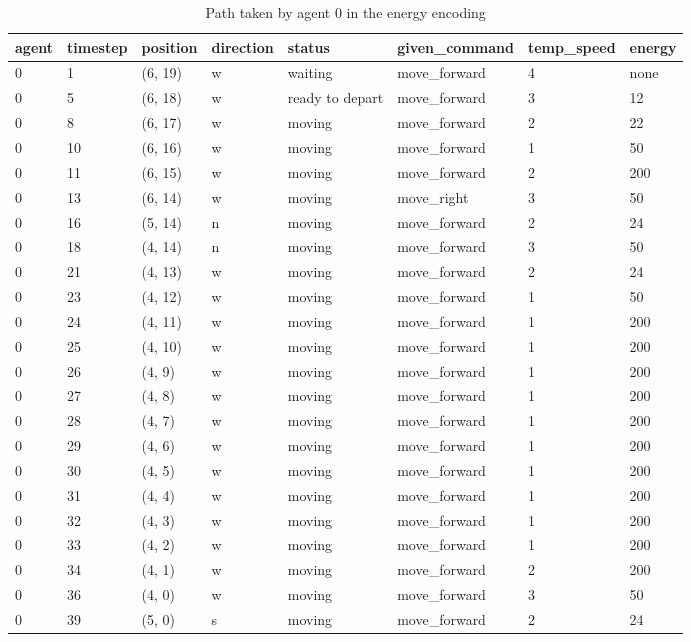 \begin{table}[H]
  \centering
  \caption{Path taken by agent 0 in the energy encoding}
  \label{tab:energy0}
  \begin{tabular}{llllllll}
    \toprule
    agent & timestep & position & direction & status & given\_command & temp\_speed & energy \\
    \midrule
0 & 1 & (6, 19) & w & waiting & move\_forward & 4 & none \\
0 & 5 & (6, 18) & w & ready to depart & move\_forward & 3 & 12 \\
0 & 8 & (6, 17) & w & moving & move\_forward & 2 & 22 \\
0 & 10 & (6, 16) & w & moving & move\_forward & 1 & 50 \\
0 & 11 & (6, 15) & w & moving & move\_forward & 2 & 200 \\
0 & 13 & (6, 14) & w & moving & move\_right & 3 & 50 \\
0 & 16 & (5, 14) & n & moving & move\_forward & 2 & 24 \\
0 & 18 & (4, 14) & n & moving & move\_forward & 3 & 50 \\
0 & 21 & (4, 13) & w & moving & move\_forward & 2 & 24 \\
0 & 23 & (4, 12) & w & moving & move\_forward & 1 & 50 \\
0 & 24 & (4, 11) & w & moving & move\_forward & 1 & 200 \\
0 & 25 & (4, 10) & w & moving & move\_forward & 1 & 200 \\
0 & 26 & (4, 9) & w & moving & move\_forward & 1 & 200 \\
0 & 27 & (4, 8) & w & moving & move\_forward & 1 & 200 \\
0 & 28 & (4, 7) & w & moving & move\_forward & 1 & 200 \\
0 & 29 & (4, 6) & w & moving & move\_forward & 1 & 200 \\
0 & 30 & (4, 5) & w & moving & move\_forward & 1 & 200 \\
0 & 31 & (4, 4) & w & moving & move\_forward & 1 & 200 \\
0 & 32 & (4, 3) & w & moving & move\_forward & 1 & 200 \\
0 & 33 & (4, 2) & w & moving & move\_forward & 1 & 200 \\
0 & 34 & (4, 1) & w & moving & move\_forward & 2 & 200 \\
0 & 36 & (4, 0) & w & moving & move\_forward & 3 & 50 \\
0 & 39 & (5, 0) & s & moving & move\_forward & 2 & 24 \\

\end{tabular}
\end{table}
